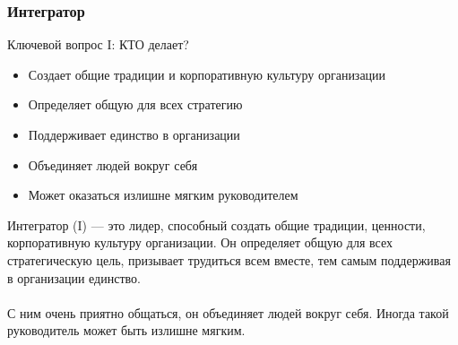 \documentclass{../industrial-development}
\begin{document}
\begin{frame} \frametitle{Интегратор}
	\begin{block}{Ключевой вопрос I:}
		КТО делает?
	\end{block}	
 \begin{itemize}
	 \item Создает общие традиции и корпоративную культуру организации
	 \item Определяет общую для всех стратегию
	 \item Поддерживает единство в организации
	 \item Объединяет людей вокруг себя
         \item Может оказаться излишне мягким руководителем
 \end{itemize}
\end{frame}
\lecturenotes
Интегратор (I) — это лидер, способный создать общие традиции, ценности, корпоративную культуру организации. Он определяет общую для всех стратегическую цель, призывает трудиться всем вместе, тем самым поддерживая в организации единство. \\~\\ С ним очень приятно общаться, он объединяет людей вокруг себя. Иногда такой руководитель может быть излишне мягким.
\end{document}
